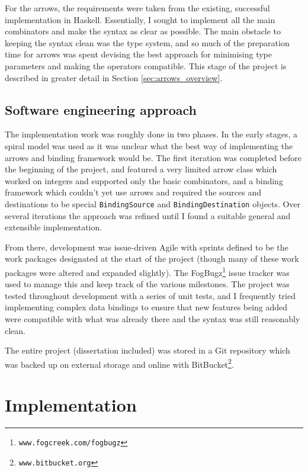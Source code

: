\documentclass[12pt,twoside,notitlepage]{report}
\begin{document}
For the arrows, the requirements were taken from the existing, successful implementation in Haskell. Essentially, I sought to implement all the main combinators and make the syntax as clear as possible. The main obstacle to keeping the syntax clean was the type system, and so much of the preparation time for arrows was spent devising the best approach for minimising type parameters and making the operators compatible. This stage of the project is described in greater detail in Section \ref{sec:arrows_overview}.

\section{Software engineering approach}

The implementation work was roughly done in two phases. In the early stages, a spiral model was used as it was unclear what the best way of implementing the arrows and binding framework would be. The first iteration was completed before the beginning of the project, and featured a very limited arrow class which worked on integers and supported only the basic combinators, and a binding framework which couldn't yet use arrows and required the sources and destinations to be special \texttt{BindingSource} and \texttt{BindingDestination} objects. Over several iterations the approach was refined until I found a suitable general and extensible implementation.

From there, development was issue-driven Agile with sprints defined to be the work packages designated at the start of the project (though many of these work packages were altered and expanded slightly). The FogBugz\footnote{\texttt{www.fogcreek.com/fogbugz}} issue tracker was used to manage this and keep track of the various milestones. The project was tested throughout development with a series of unit tests, and I frequently tried implementing complex data bindings to ensure that new features being added were compatible with what was already there and the syntax was still reasonably clean.

The entire project (dissertation included) was stored in a Git repository which was backed up on external storage and online with BitBucket\footnote{\texttt{www.bitbucket.org}}.

\cleardoublepage



\chapter{Implementation}
\end{document}
